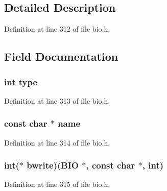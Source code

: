 \subsection{Detailed Description}


Definition at line 312 of file bio.\+h.



\subsection{Field Documentation}
\subsubsection[{\texorpdfstring{type}{type}}]{\setlength{\rightskip}{0pt plus 5cm}int type}\hypertarget{structbio__method__st_ac765329451135abec74c45e1897abf26}{}\label{structbio__method__st_ac765329451135abec74c45e1897abf26}


Definition at line 313 of file bio.\+h.

\subsubsection[{\texorpdfstring{name}{name}}]{\setlength{\rightskip}{0pt plus 5cm}const char $\ast$ name}\hypertarget{structbio__method__st_afcd1706c9144e6d6eee6127661ae3be2}{}\label{structbio__method__st_afcd1706c9144e6d6eee6127661ae3be2}


Definition at line 314 of file bio.\+h.

\subsubsection[{\texorpdfstring{bwrite}{bwrite}}]{\setlength{\rightskip}{0pt plus 5cm}int($\ast$ bwrite)({\bf B\+IO} $\ast$, const char $\ast$, int)}\hypertarget{structbio__method__st_a21c8cf83ef05caa4fc72edd982d1092a}{}\label{structbio__method__st_a21c8cf83ef05caa4fc72edd982d1092a}


Definition at line 315 of file bio.\+h.


